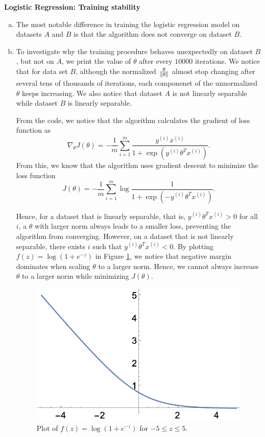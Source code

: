 \documentclass[12pt,letterpaper,boxed]{hmcpset}
\newcommand{\yy}{y^{(i)}}
\newcommand{\xx}{x^{(i)}}
\begin{document}

\begin{problem}[Problem 1]
\textbf{Logistic Regression: Training stability}
\end{problem}

\begin{solution}
  \begin{enumerate}[(a)]
    \item The most notable difference in training the logistic regression model on datasets $A$ and $B$ is that the algorithm does not converge on dataset $B$.
    
    \item To investigate why the training procedure behaves unexpectedly on dataset $B$, but not on $A$, we print the value of $\theta$ after every $10000$ iterations. We notice that for data set $B$, although the normalized $\frac{\theta}{\left\lVert \theta\right\rVert}$ almost stop changing after several tens of thousands of iterations, each componenet of the unnormalized $\theta$ keeps increasing. We also notice that dataset $A$ is not linearly separable while dataset $B$ is linearly separable.
    
    From the code, we notice that the algorithm calculates the gradient of loss function as 
    \[
    \nabla_{\theta} J(\theta) = -\frac{1}{m} \sum_{i=1}^m \frac{ \yy \xx}{1+ \exp(\yy \theta^T \xx)}.
    \]
    From this, we know that the algorithm uses gradient descent to minimize the loss function
    \[
    J(\theta) = - \frac{1}{m} \sum_{i=1}^m \log \frac{1}{1+ \exp(-\yy \theta^T \xx)}.
    \]

    Hence, for a dataset that is linearly separable, that is, $\yy \theta^T \xx > 0$ for all $i$, a $\theta$ with larger norm always leads to a smaller loss, preventing the algorithm from converging. However, on a dataset that is not linearly separable, there exists $i$ such that $\yy \theta^T \xx < 0$. By plotting $f(z) = \log (1+e^{-z})$ in Figure \ref{fz}, we notice that negative margin dominates when scaling $\theta$ to a larger norm. Hence, we cannot always increase $\theta$ to a larger norm while minimizing $J(\theta)$.

    \begin{figure}
      \centering
      \includegraphics[width=0.6\linewidth]{fz.png}
      \caption{Plot of $f(z) = \log (1+e^{-z})$ for $-5 \leq z \leq 5$.}
      \label{fz}
    \end{figure}
    

\end{enumerate}
\end{solution}
\end{document}
